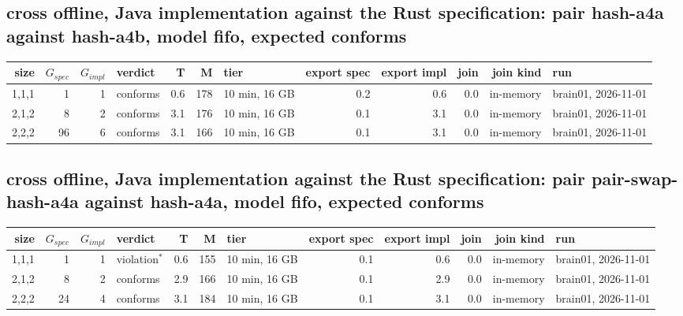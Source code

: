 \documentclass[10pt]{article}
\begin{document}
\subsection*{cross offline, Java implementation against the Rust specification: pair \textsf{hash-a4a} against \textsf{hash-a4b}, model fifo, expected conforms}
\begin{longtable}{@{}rrrlrrlrrrrl@{}}
\toprule
size & $G_{\mathit{spec}}$ & $G_{\mathit{impl}}$ & verdict & T & M & tier & export spec & export impl & join & join kind & run \\
\midrule
\endhead
\color{red} 1,1,1 & 1 & 1 & conforms & 0.6 & 178 & 10 min, 16 GB & 0.2 & 0.6 & 0.0 & in-memory & brain01, 2026-11-01 \\
\color{red} 2,1,2 & 8 & 2 & conforms & 3.1 & 176 & 10 min, 16 GB & 0.1 & 3.1 & 0.0 & in-memory & brain01, 2026-11-01 \\
\color{red} 2,2,2 & 96 & 6 & conforms & 3.1 & 166 & 10 min, 16 GB & 0.1 & 3.1 & 0.0 & in-memory & brain01, 2026-11-01 \\
\bottomrule
\end{longtable}
\subsection*{cross offline, Java implementation against the Rust specification: pair \textsf{pair-swap-hash-a4a} against \textsf{hash-a4a}, model fifo, expected conforms}
\begin{longtable}{@{}rrrlrrlrrrrl@{}}
\toprule
size & $G_{\mathit{spec}}$ & $G_{\mathit{impl}}$ & verdict & T & M & tier & export spec & export impl & join & join kind & run \\
\midrule
\endhead
\color{red} 1,1,1 & 1 & 1 & violation$^{\ast}$ & 0.6 & 155 & 10 min, 16 GB & 0.1 & 0.6 & 0.0 & in-memory & brain01, 2026-11-01 \\
\color{red} 2,1,2 & 8 & 2 & conforms & 2.9 & 166 & 10 min, 16 GB & 0.1 & 2.9 & 0.0 & in-memory & brain01, 2026-11-01 \\
\color{red} 2,2,2 & 24 & 4 & conforms & 3.1 & 184 & 10 min, 16 GB & 0.1 & 3.1 & 0.0 & in-memory & brain01, 2026-11-01 \\
\bottomrule
\end{longtable}
\end{document}

